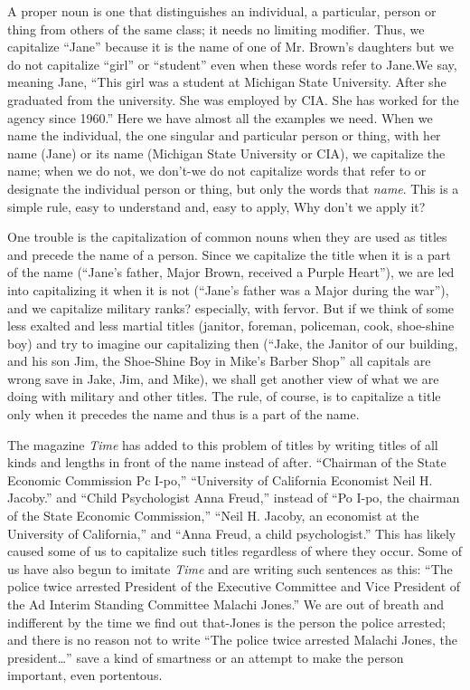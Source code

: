 \documentclass[
    oneside,
    11pt,
    draft
]{memoir}
\begin{document}
A proper noun is one that distinguishes an individual, a particular, person or thing from others of the same class; it needs no limiting modifier. Thus, we capitalize \enquote{Jane} because it is the name of one of Mr. Brown's daughters but we do not capitalize \enquote{girl} or \enquote{student} even when these words refer to Jane.We say, meaning Jane, \enquote{This girl was a student at Michigan State University. After she graduated from the university. She was employed by CIA. She has worked for the agency since 1960.} Here we have almost all the examples we need. When we name the individual, the one singular and particular person or thing, with her name (Jane) or its name (Michigan State University or CIA), we capitalize the name; when we do not, we don't-we do not capitalize words that refer to or designate the individual person or thing, but only the words that \emph{name}. This is a simple rule, easy to understand and, easy to apply, Why don't we apply it? 

One trouble is the capitalization of common nouns when they are used as titles and precede the name of a person. Since we capitalize the title when it is a part of the name (\enquote{Jane's father, Major Brown, received a Purple Heart}), we are led into capitalizing it when it is not (\enquote{Jane's father was a Major during the war}), and we capitalize military ranks? especially, with fervor. But if we think of some less exalted and less martial titles (janitor, foreman, policeman, cook, shoe-shine boy) and try to imagine our capitalizing then (\enquote{Jake, the Janitor of our building, and his son Jim, the Shoe-Shine Boy in Mike's Barber Shop} all capitals are wrong save in Jake, Jim, and Mike), we shall get another view of what we are doing with military and other titles. The rule, of course, is to capitalize a title only when it precedes the name and thus is a part of the name. 

The magazine \emph{Time} has added to this problem of titles by writing titles of all kinds and lengths in front of the name instead of after. \enquote{Chairman of the State Economic Commission Pc I-po,} \enquote{University of California Economist Neil H. Jacoby.} and \enquote{Child Psychologist Anna Freud,} instead of \enquote{Po I-po, the chairman of the State Economic Commission,} \enquote{Neil H. Jacoby, an economist at the University of California,} and \enquote{Anna Freud, a child psychologist.} This has likely caused some of us to capitalize such titles regardless of where they occur. Some of us have also begun to imitate \emph{Time} and are writing such sentences as this: \enquote{The police twice arrested President of the Executive Committee and Vice President of the Ad Interim Standing Committee Malachi Jones.} We are out of breath and indifferent by the time we find out that-Jones is the person the police arrested; and there is no reason not to write \enquote{The police twice arrested Malachi Jones, the president\dots} save a kind of smartness or an attempt to make the person important, even portentous.
\end{document}
